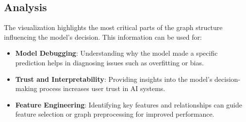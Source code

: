 	
	\subsection{Analysis}
	The visualization highlights the most critical parts of the graph structure influencing the model’s decision. This information can be used for:
	\begin{itemize}
		\item \textbf{Model Debugging}: Understanding why the model made a specific prediction helps in diagnosing issues such as overfitting or bias.
		\item \textbf{Trust and Interpretability}: Providing insights into the model's decision-making process increases user trust in AI systems.
		\item \textbf{Feature Engineering}: Identifying key features and relationships can guide feature selection or graph preprocessing for improved performance.
	\end{itemize}
	
	
	
